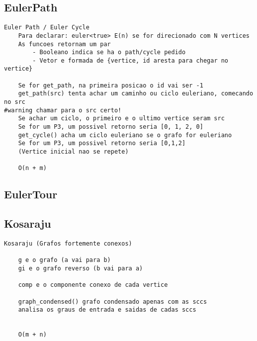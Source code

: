 \subsection{EulerPath}
\vspace{-4pt}
\begin{lstlisting}[style=description]
	Euler Path / Euler Cycle
	Para declarar: euler<true> E(n) se for direcionado com N vertices
	As funcoes retornam um par
		- Booleano indica se ha o path/cycle pedido
		- Vetor e formada de {vertice, id aresta para chegar no vertice}

	Se for get_path, na primeira posicao o id vai ser -1
	get_path(src) tenta achar um caminho ou ciclo euleriano, comecando no src
#warning chamar para o src certo!
	Se achar um ciclo, o primeiro e o ultimo vertice seram src
	Se for um P3, um possivel retorno seria [0, 1, 2, 0]
	get_cycle() acha um ciclo euleriano se o grafo for euleriano
	Se for um P3, um possivel retorno seria [0,1,2]
	(Vertice inicial nao se repete)

	O(n + m)

\end{lstlisting}
\vspace{-5pt}
\raggedbottom
\hrulefill

\vspace{-2pt}
\subsection{EulerTour}
\vspace{-5pt}
\raggedbottom
\hrulefill

\vspace{-2pt}
\subsection{Kosaraju}
\vspace{-4pt}
\begin{lstlisting}[style=description]
    Kosaraju (Grafos fortemente conexos)

    g e o grafo (a vai para b)
    gi e o grafo reverso (b vai para a)

    comp e o componente conexo de cada vertice

    graph_condensed() grafo condensado apenas com as sccs
    analisa os graus de entrada e saidas de cadas sccs


    O(m + n)

\end{lstlisting}
\vspace{-5pt}
\raggedbottom
\hrulefill

